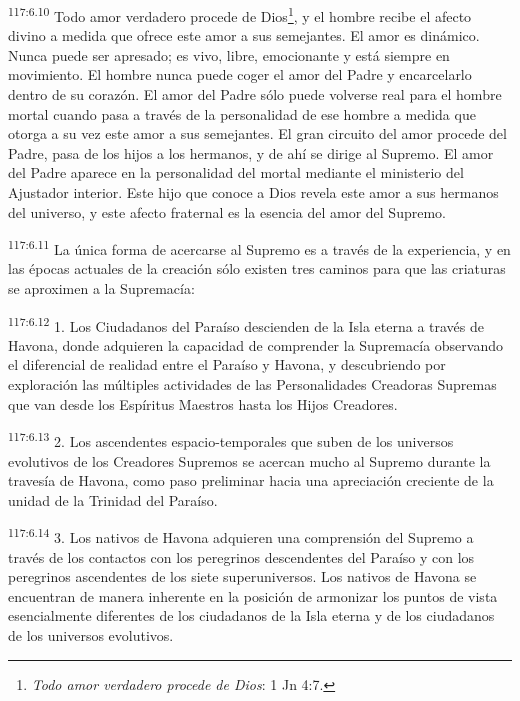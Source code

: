 \documentclass[twoside, 11pt]{book}
\begin{document}
\par
\textsuperscript{117:6.10} Todo amor verdadero procede de Dios\footnote{\textit{Todo amor verdadero procede de Dios}: 1 Jn 4:7.}, y el hombre recibe el afecto divino a medida que ofrece este amor a sus semejantes. El amor es dinámico. Nunca puede ser apresado; es vivo, libre, emocionante y está siempre en movimiento. El hombre nunca puede coger el amor del Padre y encarcelarlo dentro de su corazón. El amor del Padre sólo puede volverse real para el hombre mortal cuando pasa a través de la personalidad de ese hombre a medida que otorga a su vez este amor a sus semejantes. El gran circuito del amor procede del Padre, pasa de los hijos a los hermanos, y de ahí se dirige al Supremo. El amor del Padre aparece en la personalidad del mortal mediante el ministerio del Ajustador interior. Este hijo que conoce a Dios revela este amor a sus hermanos del universo, y este afecto fraternal es la esencia del amor del Supremo.

\par
\textsuperscript{117:6.11} La única forma de acercarse al Supremo es a través de la experiencia, y en las épocas actuales de la creación sólo existen tres caminos para que las criaturas se aproximen a la Supremacía:

\par
\textsuperscript{117:6.12} 1. Los Ciudadanos del Paraíso descienden de la Isla eterna a través de Havona, donde adquieren la capacidad de comprender la Supremacía observando el diferencial de realidad entre el Paraíso y Havona, y descubriendo por exploración las múltiples actividades de las Personalidades Creadoras Supremas que van desde los Espíritus Maestros hasta los Hijos Creadores.

\par
\textsuperscript{117:6.13} 2. Los ascendentes espacio-temporales que suben de los universos evolutivos de los Creadores Supremos se acercan mucho al Supremo durante la travesía de Havona, como paso preliminar hacia una apreciación creciente de la unidad de la Trinidad del Paraíso.

\par
\textsuperscript{117:6.14} 3. Los nativos de Havona adquieren una comprensión del Supremo a través de los contactos con los peregrinos descendentes del Paraíso y con los peregrinos ascendentes de los siete superuniversos. Los nativos de Havona se encuentran de manera inherente en la posición de armonizar los puntos de vista esencialmente diferentes de los ciudadanos de la Isla eterna y de los ciudadanos de los universos evolutivos.
\end{document}
